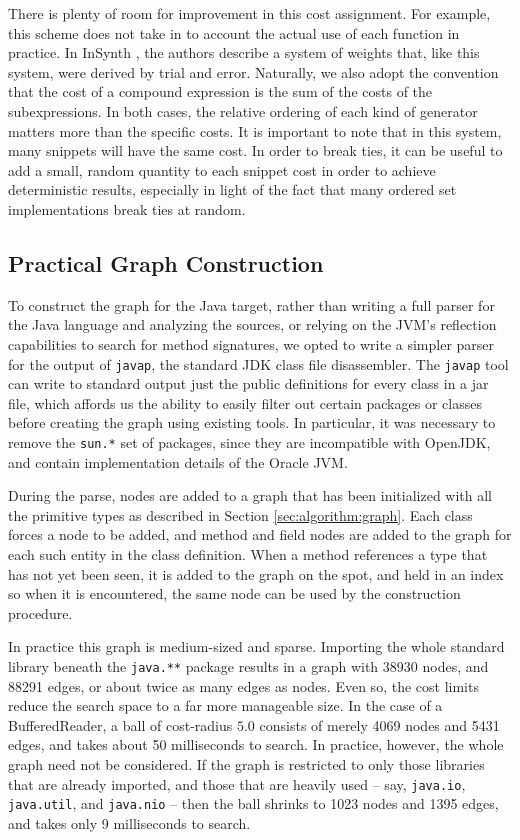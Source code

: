 There is plenty of room for improvement in this cost assignment. For example, this scheme does not take in to account the actual use of each function in practice. In InSynth \citep{GveroETAL13CompleteCompletionTypesWeights}, the authors describe a system of weights that, like this system, were derived by trial and error. Naturally, we also adopt the convention that the cost of a compound expression is the sum of the costs of the subexpressions. In both cases, the relative ordering of each kind of generator matters more than the specific costs. It is important to note that in this system, many snippets will have the same cost. In order to break ties, it can be useful to add a small, random quantity to each snippet cost in order to achieve deterministic results, especially in light of the fact that many ordered set implementations break ties at random.

\subsection{Practical Graph Construction}

To construct the graph for the Java target, rather than writing a full parser for the Java language and analyzing the sources, or relying on the JVM's reflection capabilities to search for method signatures, we opted to write a simpler parser for the output of \texttt{javap}, the standard JDK class file disassembler. The \texttt{javap} tool can write to standard output just the public definitions for every class in a jar file, which affords us the ability to easily filter out certain packages or classes before creating the graph using existing tools. In particular, it was necessary to remove the \texttt{sun.*} set of packages, since they are incompatible with OpenJDK, and contain implementation details of the Oracle JVM.

During the parse, nodes are added to a graph that has been initialized with all the primitive types as described in Section \ref{sec:algorithm:graph}. Each class forces a node to be added, and method and field nodes are added to the graph for each such entity in the class definition. When a method references a type that has not yet been seen, it is added to the graph on the spot, and held in an index so when it is encountered, the same node can be used by the construction procedure.

In practice this graph is medium-sized and sparse. Importing the whole standard library beneath the \texttt{java.**} package results in a graph with 38930 nodes, and 88291 edges, or about twice as many edges as nodes. Even so, the cost limits reduce the search space to a far more manageable size. In the case of a BufferedReader, a ball of cost-radius $5.0$ consists of merely 4069 nodes and 5431 edges, and takes about 50 milliseconds to search. In practice, however, the whole graph need not be considered. If the graph is restricted to only those libraries that are already imported, and those that are heavily used -- say, \texttt{java.io}, \texttt{java.util}, and \texttt{java.nio} -- then the ball shrinks to 1023 nodes and 1395 edges, and takes only 9 milliseconds to search.
